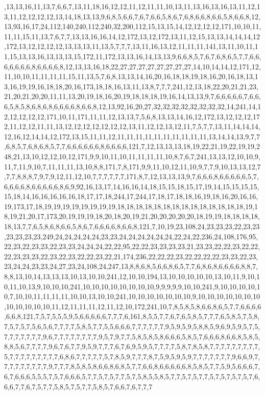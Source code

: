 ,13,13,16,11,13,7,6,6,7,13,11,18,16,12,12,11,12,11,11,10,13,11,13,16,13,16,13,11,12,13,11,12,12,12,12,13,14,18,13,13,9,6,8,5,6,6,7,6,7,6,6,5,8,6,7,6,8,6,6,8,6,6,5,8,6,6,8,12,13,93,16,17,24,112,140,240,112,240,32,200,112,15,13,15,14,12,12,12,12,171,10,10,11,11,11,15,11,13,7,6,7,7,13,13,16,16,14,12,172,13,12,172,13,11,12,15,13,13,14,14,14,12,172,13,12,12,12,12,13,13,13,11,13,5,7,7,7,13,11,16,13,12,11,11,11,141,13,11,10,11,11,15,13,13,16,13,13,13,15,172,11,172,13,13,16,14,13,13,9,6,6,8,5,7,6,7,6,8,6,5,7,7,6,6,6,6,6,6,6,8,6,6,6,6,8,12,13,13,16,18,22,27,27,27,27,27,27,27,27,14,10,14,14,12,171,12,11,10,10,11,11,11,11,15,11,13,5,7,6,8,13,13,14,16,20,16,18,18,19,18,16,20,16,18,13,13,16,19,19,16,18,18,20,16,173,18,18,16,13,11,13,8,7,7,7,241,12,13,18,22,20,21,21,23,21,20,21,20,20,11,11,13,20,19,18,16,20,19,18,18,18,19,16,14,13,13,9,7,6,6,6,6,6,7,6,6,6,5,8,5,8,6,8,6,8,6,6,6,6,8,6,6,8,12,13,92,16,20,27,32,32,32,32,32,32,32,32,14,241,14,12,12,12,12,12,171,10,11,171,11,11,12,13,13,7,5,6,8,13,13,14,16,12,172,13,12,12,12,172,11,12,12,11,11,13,12,12,12,12,12,12,12,13,11,12,12,13,12,11,7,5,7,7,13,11,14,14,14,12,16,12,14,14,12,172,13,15,11,11,12,11,11,11,11,11,11,11,11,11,11,13,14,14,13,9,7,7,6,8,5,7,6,8,6,8,5,7,7,6,6,6,6,6,6,8,6,6,6,6,121,7,12,13,13,13,18,19,22,21,19,22,19,19,248,21,13,10,12,12,10,12,171,9,9,10,11,10,11,11,11,11,10,8,7,6,7,241,13,13,12,10,10,9,11,7,11,9,10,7,11,11,11,13,10,8,8,171,7,8,171,9,9,11,10,12,11,10,9,7,7,9,10,13,13,12,7,7,7,8,8,8,7,9,7,9,12,11,12,10,7,7,7,7,7,7,171,8,7,12,13,13,13,9,7,6,6,6,8,6,6,6,6,6,5,7,6,6,6,6,8,6,6,6,6,6,8,6,9,92,16,13,17,14,16,16,14,18,15,15,18,15,17,19,14,15,15,15,15,15,18,14,16,16,16,16,16,18,17,17,18,244,17,244,17,18,17,18,18,16,19,18,16,20,16,16,19,173,17,18,19,19,19,19,19,19,19,19,18,18,18,18,18,18,18,18,18,18,18,18,18,18,19,18,19,21,20,17,173,20,19,19,19,18,20,18,20,19,21,20,20,20,20,20,18,19,19,18,18,18,18,18,13,7,7,6,5,8,6,8,6,6,5,8,6,7,6,6,6,6,8,6,6,8,121,7,10,19,23,108,24,23,23,23,22,23,23,23,23,23,23,249,24,24,24,24,24,23,23,24,24,24,24,24,24,22,24,22,236,24,108,176,95,22,23,22,23,23,22,23,23,24,24,24,22,22,95,22,22,23,23,23,23,21,23,23,22,22,23,22,22,22,23,23,23,22,23,22,23,22,22,23,22,21,174,236,22,22,22,23,22,22,22,22,23,23,22,23,23,24,24,23,23,24,27,23,24,108,24,247,13,8,8,6,8,5,6,6,8,6,5,7,7,6,8,6,8,6,6,6,6,8,8,7,8,8,13,10,14,13,13,13,10,13,10,10,241,12,10,10,194,13,10,10,10,10,10,13,10,11,9,10,10,11,10,13,9,10,10,10,241,10,10,10,10,10,10,10,10,9,9,9,9,9,10,10,241,9,10,10,10,10,10,7,10,10,11,11,11,11,10,10,13,10,10,241,10,10,10,10,10,10,10,9,10,10,10,10,10,10,10,10,10,10,10,10,11,12,11,11,11,12,11,12,10,172,241,10,7,8,5,8,5,8,6,6,8,6,5,7,7,6,6,6,6,6,6,8,121,7,5,7,5,5,5,9,5,6,6,6,6,6,7,7,7,6,161,8,5,5,7,7,6,7,6,5,8,5,7,7,7,6,5,8,5,7,5,8,7,5,7,5,7,5,6,5,6,7,7,7,7,5,8,5,7,7,5,5,6,6,6,7,7,7,7,7,7,9,5,9,5,9,5,8,8,5,9,6,9,5,9,5,7,5,7,7,7,7,7,7,7,9,6,7,7,7,7,7,7,7,7,9,5,7,9,7,7,5,8,5,8,5,8,6,6,6,5,8,5,7,6,6,6,8,6,6,8,5,8,5,8,8,5,6,7,7,7,7,9,6,7,6,7,7,9,5,9,7,7,7,6,7,6,9,5,9,5,7,7,7,7,5,8,7,8,5,8,7,7,7,7,7,7,7,7,7,5,7,7,7,7,7,7,7,7,7,6,8,6,7,7,7,7,7,5,7,8,5,9,7,7,7,8,7,5,9,5,9,5,9,7,7,7,7,7,7,7,9,6,6,9,7,7,7,7,7,7,7,7,7,9,7,7,7,8,5,8,5,8,6,6,8,6,8,5,7,7,6,6,8,6,6,6,6,6,8,5,8,5,7,7,5,9,5,6,6,6,7,6,7,6,6,6,5,5,5,7,5,7,6,6,6,5,7,7,5,7,5,7,7,5,7,5,8,5,5,8,5,7,7,5,7,5,7,7,5,7,5,7,5,7,5,7,6,6,6,7,7,6,7,5,7,7,5,8,5,7,5,7,7,5,8,5,7,6,6,7,6,7,7,7